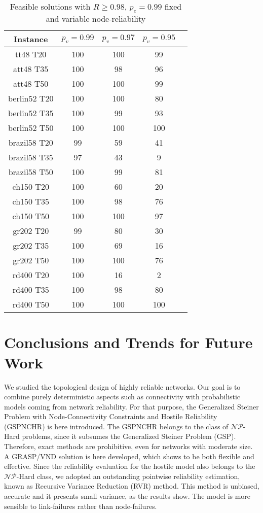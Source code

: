 \documentclass{llncs}
\begin{document}
\begin{table}
\caption{Feasible solutions with $R \geq 0.98$, $p_e=0.99$ fixed 
and variable node-reliability} %
\centering  %
\begin{tabular}{|c|c|c|c|c|} %
\hline	Instance  &	$p_v=0.99$ & 	$p_v=0.97$ & 	$p_v=0.95$\\
\hline	tt48 T20	&	100	&	100	&	99	\\
\hline	att48 T35	&	100	&	98	&	96	\\
\hline	att48 T50	&	100	&	100	&	99	\\
\hline	berlin52 T20	&	100	&	100	&	80	\\
\hline	berlin52 T35	&	100	&	99	&	93	\\
\hline	berlin52 T50	&	100	&	100	&	100	\\
\hline	brazil58 T20	&	99	&	59	&	41	\\
\hline	brazil58 T35	&	97	&	43	&	9	\\
\hline	brazil58 T50	&	100	&	99	&	81	\\
\hline	ch150 T20	&	100	&	60	&	20	\\
\hline	ch150 T35	&	100	&	98	&	76	\\
\hline	ch150 T50	&	100	&	100	&	97	\\
\hline	gr202 T20	&	99	&	80	&	30	\\
\hline	gr202 T35	&	100	&	69	&	16	\\
\hline	gr202 T50	&	100	&	100	&	76	\\
\hline	rd400 T20	&	100	&	16	&	2	\\
\hline	rd400 T35	&	100	&	98	&	80	\\
\hline	rd400 T50	&	100	&	100	&	100	\\
\hline
\end{tabular}
\label{answer2b} %
\end{table}




\section{Conclusions and Trends for Future Work}\label{conclusions}
We studied the topological design of highly reliable networks. Our goal is to combine purely  deterministic aspects such as connectivity with probabilistic models coming from network reliability. For that purpose, the Generalized Steiner Problem with Node-Connectivity Constraints and Hostile Reliability (GSPNCHR) is here introduced. The GSPNCHR belongs to the class of $\mathcal{NP}$-Hard problems, since it subsumes the Generalized Steiner Problem (GSP). Therefore, exact methods are prohibitive, even for networks with moderate size. A GRASP/VND solution is here developed, which shows to be both flexible and effective. 
Since the reliability evaluation for the hostile model also belongs to the $\mathcal{NP}$-Hard class, we adopted an outstanding pointwise reliability estimation, known as Recursive Variance Reduction (RVR) method. 
This method is unbiased, accurate and it presents small variance, as the results show. The model is more sensible to link-failures rather than node-failures.
\end{document}
